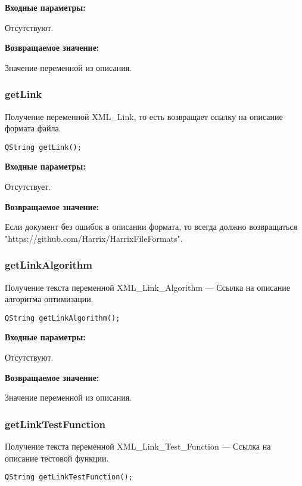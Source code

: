 \textbf{Входные параметры:}

Отсутствуют.

\textbf{Возвращаемое значение:}

Значение переменной из описания.


\subsubsection{getLink}\label{getLink}

Получение переменной XML\_Link, то есть возвращает ссылку на описание формата файла.


\begin{lstlisting}[label=code_syntax_getLink,caption=Синтаксис]
QString getLink();
\end{lstlisting}

\textbf{Входные параметры:}

Отсутствует.

\textbf{Возвращаемое значение:}

Если документ без ошибок в описании формата, то всегда должно возвращаться "https://github.com/Harrix/HarrixFileFormats".


\subsubsection{getLinkAlgorithm}\label{getLinkAlgorithm}

Получение текста переменной  XML\_Link\_Algorithm --- Ссылка на описание алгоритма оптимизации.


\begin{lstlisting}[label=code_syntax_getLinkAlgorithm,caption=Синтаксис]
QString getLinkAlgorithm();
\end{lstlisting}

\textbf{Входные параметры:}

Отсутствуют.

\textbf{Возвращаемое значение:}

Значение переменной из описания.


\subsubsection{getLinkTestFunction}\label{getLinkTestFunction}

Получение текста переменной  XML\_Link\_Test\_Function --- Ссылка на описание тестовой функции.


\begin{lstlisting}[label=code_syntax_getLinkTestFunction,caption=Синтаксис]
QString getLinkTestFunction();
\end{lstlisting}

